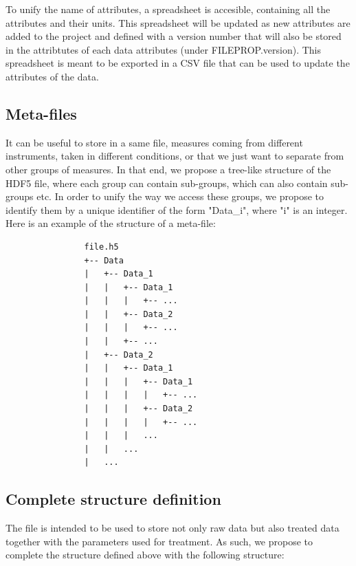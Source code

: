 \documentclass{book}
\begin{document}
            To unify the name of attributes, a spreadsheet is accesible, containing all the attributes and their units. This spreadsheet will be updated as new attributes are added to the project and defined with a version number that will also be stored in the attribtutes of each data attributes (under FILEPROP.version). This spreadsheet is meant to be exported in a CSV file that can be used to update the attributes of the data.

        \subsection*{Meta-files}
            It can be useful to store in a same file, measures coming from different instruments, taken in different conditions, or that we just want to separate from other groups of measures. In that end, we propose a tree-like structure of the HDF5 file, where each group can contain sub-groups, which can also contain sub-groups etc. In order to unify the way we access these groups, we propose to identify them by a unique identifier of the form "Data\_i", where "i" is an integer. Here is an example of the structure of a meta-file:

            \begin{verbatim}
                file.h5
                +-- Data
                |   +-- Data_1
                |   |   +-- Data_1
                |   |   |   +-- ...
                |   |   +-- Data_2
                |   |   |   +-- ...
                |   |   +-- ...
                |   +-- Data_2
                |   |   +-- Data_1
                |   |   |   +-- Data_1
                |   |   |   |   +-- ...
                |   |   |   +-- Data_2
                |   |   |   |   +-- ...
                |   |   |   ...
                |   |   ...
                |   ...
            \end{verbatim}

        \subsection*{Complete structure definition}
            The file is intended to be used to store not only raw data but also treated data together with the parameters used for treatment. As such, we propose to complete the structure defined above with the following structure:
\end{document}
